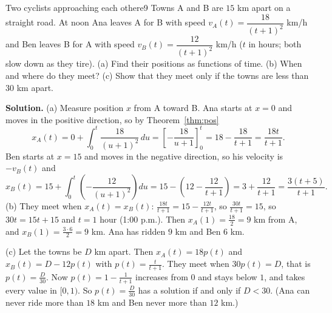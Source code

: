 \documentclass[11pt]{article}
\begin{document}
\begin{exmp}{Two cyclists approaching each other}{e9}
Towns A and B are $15$ km apart on a straight road. At noon Ana leaves A for B with speed $v_A(t)=\dfrac{18}{(t+1)^2}$ km/h and Ben leaves B for A with speed $v_B(t)=\dfrac{12}{(t+1)^2}$ km/h ($t$ in hours; both slow down as they tire). (a) Find their positions as functions of time. (b) When and where do they meet? (c) Show that they meet only if the towns are less than $30$ km apart.

\textbf{Solution.} (a) Measure position $x$ from A toward B. Ana starts at $x=0$ and moves in the positive direction, so by Theorem~\ref{thm:pos}
\[
x_A(t)=0+\int_0^t\frac{18}{(u+1)^2}\,du=\left[-\frac{18}{u+1}\right]_0^t=18-\frac{18}{t+1}=\frac{18t}{t+1}.
\]
Ben starts at $x=15$ and moves in the negative direction, so his velocity is $-v_B(t)$ and
\[
x_B(t)=15+\int_0^t\left(-\frac{12}{(u+1)^2}\right)du=15-\left(12-\frac{12}{t+1}\right)=3+\frac{12}{t+1}=\frac{3(t+5)}{t+1}.
\]
(b) They meet when $x_A(t)=x_B(t)$: $\frac{18t}{t+1}=15-\frac{12t}{t+1}$, so $\frac{30t}{t+1}=15$, so $30t=15t+15$ and $t=1$ hour (1:00 p.m.). Then $x_A(1)=\frac{18}2=9$ km from A, and $x_B(1)=\frac{3\cdot6}2=9$ km. \checkmark Ana has ridden $9$ km and Ben $6$ km.

(c) Let the towns be $D$ km apart. Then $x_A(t)=18p(t)$ and $x_B(t)=D-12p(t)$ with $p(t)=\frac t{t+1}$. They meet when $30p(t)=D$, that is $p(t)=\frac D{30}$. Now $p(t)=1-\frac1{t+1}$ increases from $0$ and stays below $1$, and takes every value in $[0,1)$. So $p(t)=\frac D{30}$ has a solution if and only if $D<30$. (Ana can never ride more than $18$ km and Ben never more than $12$ km.)


\end{exmp}
\end{document}
